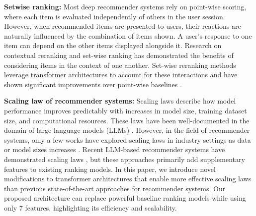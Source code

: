 \textbf{Setwise ranking:} Most deep recommender systems rely on point-wise scoring, where each item is evaluated independently of others in the user session. However, when recommended items are presented to users, their reactions are naturally influenced by the combination of items shown. A user's response to one item can depend on the other items displayed alongside it. Research on contextual reranking and set-wise ranking has demonstrated the benefits of considering items in the context of one another. Set-wise reranking methods leverage transformer architectures to account for these interactions and have shown significant improvements over point-wise baselines \cite{SetRank_paper, feng2021grngenerativereranknetwork, RankFormer_paper, Non_autoregressive_paper, PRM_paper, Pear_paper}.

\textbf{Scaling law of recommender systems:}
Scaling laws describe how model performance improves predictably with increases in model size, training dataset size, and computational resources. These laws have been well-documented in the domain of large language models (LLMs) \cite{Scaling_Law_LLM_kaplan2020scalinglawsneurallanguage}. However, in the field of recommender systems, only a few works have explored scaling laws in industry settings as data or model sizes increases \cite{zhang2024wukongscalinglawlargescale, HLLMchen2024hll_paper, HSTU_paper_zhai24a}.  Recent LLM-based recommender systems have demonstrated scaling laws \cite{HLLMchen2024hll_paper}, but these approaches primarily add supplementary features to existing ranking models. In this paper, we introduce novel modifications to transformer architectures that enable more effective scaling laws than previous state-of-the-art approaches for recommender systems. Our proposed architecture can replace powerful baseline ranking models while using only 7 features, highlighting its efficiency and scalability.